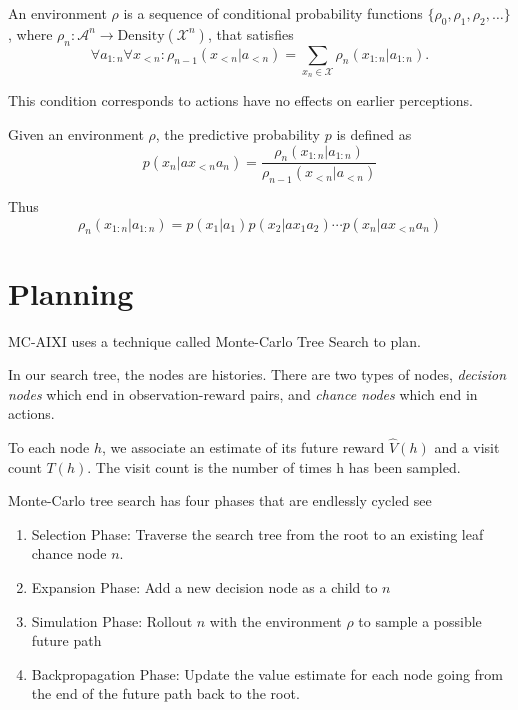 \documentclass[12pt,a4paper,twoside]{article}
\theoremstyle{upright}
\begin{document}
\dfn An environment $\rho$ is a sequence of conditional probability functions
$\{\rho_0, \rho_1, \rho_2, \ldots \}$,
where $\rho_n : \mathscr{A}^n \to \text{Density}(\mathscr{X}^n)$, that satisfies
\[\forall a_{1:n} \forall x_{<n} : \rho_{n-1}(x_{<n} | a_{<n}) = 
\sum_{x_n \in \mathscr{X}} \rho_n(x_{1:n} | a_{1:n}).\]

This condition corresponds to actions have no effects on earlier perceptions.

Given an environment $\rho$, the predictive probability $p$ is defined as
\begin{equation}
p(x_n | ax_{<n}a_n) = \frac{\rho_n(x_{1:n} | a_{1:n})}{\rho_{n-1}(x_{<n} | a_{<n})}
\end{equation}

Thus 
\begin{equation}
\rho_n(x_{1:n} | a_{1:n}) = p(x_1 | a_1) p(x_2 | ax_1a_2) \cdots p(x_n |ax_{<n}a_n)
\end{equation}



\section{Planning}


MC-AIXI uses a technique called Monte-Carlo Tree Search to plan.

In our search tree, the nodes are histories. There are two types of nodes,
\emph{decision nodes} which end in observation-reward pairs, and \emph{chance nodes} which end in actions.

To each node $h$, we associate an estimate of its future reward $\hat V(h)$ and a visit count $T(h)$. 
The visit count is the number of times h has been sampled.


Monte-Carlo tree search has four phases that are endlessly cycled see 

\begin{enumerate}

\item Selection Phase: Traverse the search tree from the root to an existing leaf chance node $n$.
\item Expansion Phase: Add a new decision node as a child to $n$
\item Simulation Phase: Rollout $n$ with the environment $\rho$ to sample a possible future path
\item Backpropagation Phase: Update the value estimate for each node going from the end of the future path 
 back to the root.

\end{enumerate}
\end{document}
